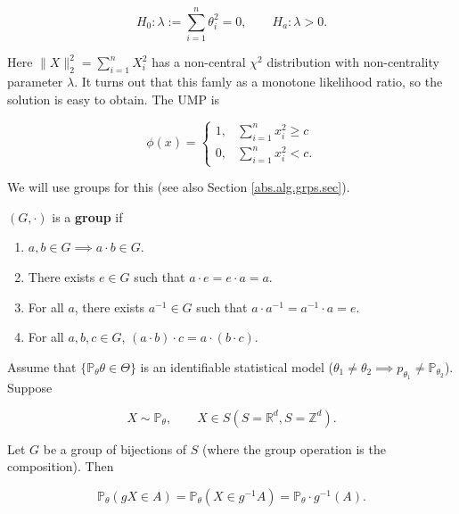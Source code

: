 \begin{example}
\[
H_0: \lambda := \sum_{i=1}^n \theta_i^2 = 0  , \qquad H_a: \lambda > 0 .
\]

Here \(\lVert X \rVert_2^2 = \sum_{i=1}^n X_i^2\) has a non-central \(\chi^2\) distribution with non-centrality parameter \(\lambda\). It turns out that this famly as a monotone likelihood ratio, so the solution is easy to obtain. The UMP is 

\[
\phi(x) = \begin{cases} 
1, & \sum_{i=1}^n x_i^2 \geq c \\
0, &  \sum_{i=1}^n x_i^2 < c.
\end{cases}
\]

\end{example}

We will use groups for this (see also Section \ref{abs.alg.grps.sec}).

\begin{definition}

\((G , \cdot)\) is a \textbf{group} if

\begin{enumerate}

\item \(a, b \in G \implies a \cdot b \in G\). 

\item There exists \(e \in G\) such that \(a \cdot e = e \cdot a = a\).

\item For all \(a\), there exists \(a^{-1} \in G\) such that \(a \cdot a^{-1}=  a^{-1} \cdot a = e\). 

\item For all \(a, b , c \in G\), \((a \cdot b) \cdot c = a \cdot (b \cdot c)\). 

\end{enumerate}

\end{definition}

\begin{theorem}

Assume that \(\{\mathbb{P}_\theta \theta \in \Theta\}\) is an identifiable statistical model (\(\theta_1 \neq \theta_2 \implies p_{\theta_1} \neq \mathbb{P}_{\theta_2}\)). Suppose 

\[
X \sim \mathbb{P}_\theta, \qquad X \in S (S = \mathbb{R}^d, S = \mathbb{Z}^d).
\]

Let \(G\) be a group of bijections of \(S\) (where the group operation is the composition). Then

\[
\mathbb{P}_\theta(gX \in A) = \mathbb{P}_\theta(X \in g^{-1}A) = \mathbb{P}_\theta \cdot g^{-1}(A).
\]

\end{theorem}

